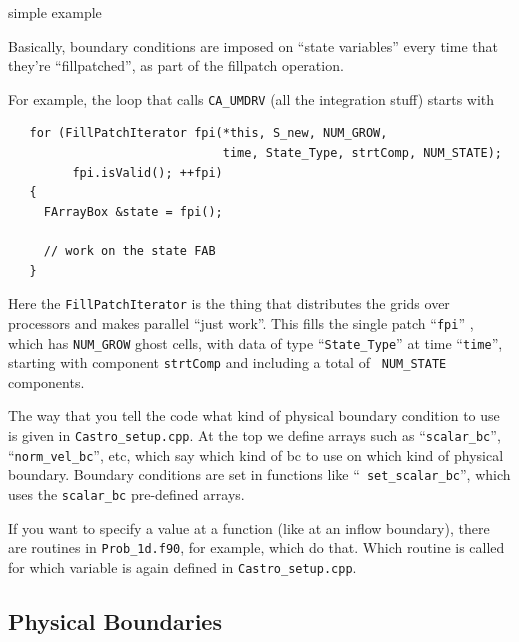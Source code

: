 {\color{red}simple example}

Basically, boundary conditions are imposed on ``state variables'' every
time that they're ``fillpatched'', as part of the fillpatch operation.

For example, the loop that calls {\tt CA\_UMDRV} (all the integration stuff) starts with
\begin{lstlisting}
   for (FillPatchIterator fpi(*this, S_new, NUM_GROW,
                              time, State_Type, strtComp, NUM_STATE);
         fpi.isValid(); ++fpi)
   {
     FArrayBox &state = fpi();

     // work on the state FAB
   }
\end{lstlisting}
Here the {\tt FillPatchIterator} is the thing that distributes the
grids over processors and makes parallel ``just work''. This fills the
single patch ``{\tt fpi}'' , which has {\tt NUM\_GROW} ghost cells,
with data of type ``{\tt State\_Type}'' at time ``{\tt time}'',
starting with component {\tt strtComp} and including a total of {\tt
  NUM\_STATE} components.

The way that you tell the code what kind of physical boundary
condition to use is given in {\tt Castro\_setup.cpp}. At the top we
define arrays such as ``{\tt scalar\_bc}'', ``{\tt norm\_vel\_bc}'',
etc, which say which kind of bc to use on which kind of physical
boundary.  Boundary conditions are set in functions like ``{\tt
  set\_scalar\_bc}'', which uses the {\tt scalar\_bc} pre-defined
arrays.

If you want to specify a value at a function (like at an inflow
boundary), there are routines in {\tt Prob\_1d.f90}, for example, which do
that. Which routine is called for which variable is again defined in
{\tt Castro\_setup.cpp}.


\subsection{Physical Boundaries}

